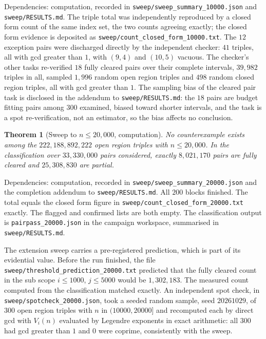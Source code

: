 \documentclass[11pt]{article}
\newtheorem{theorem}{Theorem}[section]
\theoremstyle{remark}
\begin{document}
Dependencies: computation, recorded in \texttt{sweep/sweep\_summary\_10000.json} and \texttt{sweep/RESULTS.md}. The triple total was independently reproduced by a closed form count of the same index set, the two counts agreeing exactly; the closed form evidence is deposited as \texttt{sweep/count\_closed\_form\_10000.txt}. The $12$ exception pairs were discharged directly by the independent checker: $41$ triples, all with gcd greater than $1$, with $(9,4)$ and $(10,5)$ vacuous. The checker's other tasks re-verified $18$ fully cleared pairs over their complete intervals, $39{,}982$ triples in all, sampled $1{,}996$ random open region triples and $498$ random closed region triples, all with gcd greater than $1$. The sampling bias of the cleared pair task is disclosed in the addendum to \texttt{sweep/RESULTS.md}: the $18$ pairs are budget fitting pairs among $300$ examined, biased toward shorter intervals, and the task is a spot re-verification, not an estimator, so the bias affects no conclusion.

\begin{theorem}[Sweep to $n\le 20{,}000$, computation]
\label{thm:sweep2}
No counterexample exists among the $222{,}188{,}892{,}222$ open region triples with $n\le 20{,}000$. In the classification over $33{,}330{,}000$ pairs considered, exactly $8{,}021{,}170$ pairs are fully cleared and $25{,}308{,}830$ are partial.
\end{theorem}

Dependencies: computation, recorded in \texttt{sweep/sweep\_summary\_20000.json} and the completion addendum to \texttt{sweep/RESULTS.md}. All $200$ blocks finished. The total equals the closed form figure in \texttt{sweep/count\_closed\_form\_20000.txt} exactly. The flagged and confirmed lists are both empty. The classification output is \texttt{pairpass\_20000.json} in the campaign workspace, summarised in \texttt{sweep/RESULTS.md}.

The extension sweep carries a pre-registered prediction, which is part of its evidential value. Before the run finished, the file \texttt{sweep/threshold\_prediction\_20000.txt} predicted that the fully cleared count in the sub scope $i\le 1000$, $j\le 5000$ would be $1{,}302{,}183$. The measured count computed from the classification matched exactly. An independent spot check, in \texttt{sweep/spotcheck\_20000.json}, took a seeded random sample, seed $20261029$, of $300$ open region triples with $n$ in $(10000,20000]$ and recomputed each by direct gcd with $V_i(n)$ evaluated by Legendre exponents in exact arithmetic: all $300$ had gcd greater than $1$ and $0$ were coprime, consistently with the sweep.
\end{document}
